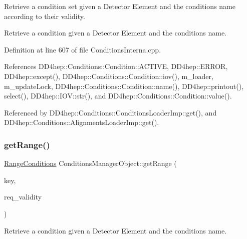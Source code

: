 Retrieve a condition set given a Detector Element and the conditions name according to their validity. 

Retrieve a condition given a Detector Element and the conditions name. 

Definition at line 607 of file Conditions\+Interna.\+cpp.



References D\+D4hep\+::\+Conditions\+::\+Condition\+::\+A\+C\+T\+I\+VE, D\+D4hep\+::\+E\+R\+R\+OR, D\+D4hep\+::except(), D\+D4hep\+::\+Conditions\+::\+Condition\+::iov(), m\+\_\+loader, m\+\_\+update\+Lock, D\+D4hep\+::\+Conditions\+::\+Condition\+::name(), D\+D4hep\+::printout(), select(), D\+D4hep\+::\+I\+O\+V\+::str(), and D\+D4hep\+::\+Conditions\+::\+Condition\+::value().



Referenced by D\+D4hep\+::\+Conditions\+::\+Conditions\+Loader\+Imp\+::get(), and D\+D4hep\+::\+Conditions\+::\+Alignments\+Loader\+Imp\+::get().

\hypertarget{class_d_d4hep_1_1_conditions_1_1_conditions_manager_object_aca98e38d7025351eb289feafa2cece97}{}\label{class_d_d4hep_1_1_conditions_1_1_conditions_manager_object_aca98e38d7025351eb289feafa2cece97} 
\subsubsection{\texorpdfstring{get\+Range()}{getRange()}}
{\footnotesize\ttfamily \hyperlink{namespace_d_d4hep_1_1_conditions_ae765f0140a33973a430280f02b6062f4}{Range\+Conditions} Conditions\+Manager\+Object\+::get\+Range (\begin{DoxyParamCaption}\item[{\hyperlink{class_d_d4hep_1_1_conditions_1_1_condition_a7528efa762e8cc072ef80ea67c3531f9}{Condition\+::key\+\_\+type}}]{key,  }\item[{const \hyperlink{class_d_d4hep_1_1_conditions_1_1_conditions_manager_object_a0190ec510ca46da4a1cc908ac3c3a1dd}{iov\+\_\+type} \&}]{req\+\_\+validity }\end{DoxyParamCaption})}



Retrieve a condition given a Detector Element and the conditions name. 




